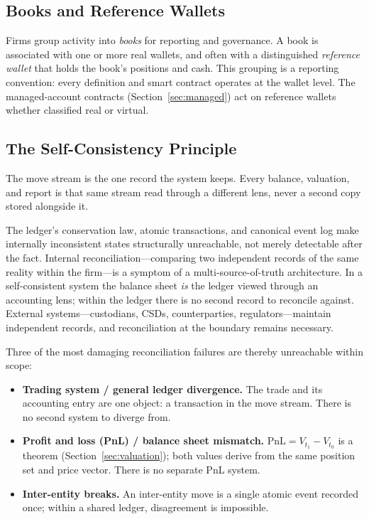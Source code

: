 \subsection{Books and Reference Wallets}

Firms group activity into \emph{books} for reporting and governance. A book is associated with one or more real wallets, and often with a distinguished \emph{reference wallet} that holds the book's positions and cash. This grouping is a reporting convention: every definition and smart contract operates at the wallet level. The managed-account contracts (Section~\ref{sec:managed}) act on reference wallets whether classified real or virtual.

\subsection{The Self-Consistency Principle}

The move stream is the one record the system keeps. Every balance, valuation, and report is that same stream read through a different lens, never a second copy stored alongside it.

\begin{principle}
The ledger's conservation law, atomic transactions, and canonical event log make internally inconsistent states structurally unreachable, not merely detectable after the fact. Internal reconciliation---comparing two independent records of the same reality within the firm---is a symptom of a multi-source-of-truth architecture. In a self-consistent system the balance sheet \emph{is} the ledger viewed through an accounting lens; within the ledger there is no second record to reconcile against. External systems---custodians, CSDs, counterparties, regulators---maintain independent records, and reconciliation at the boundary remains necessary.
\end{principle}

Three of the most damaging reconciliation failures are thereby unreachable within scope:

\begin{itemize}[nosep]
\item \textbf{Trading system / general ledger divergence.} The trade and its accounting entry are one object: a transaction in the move stream. There is no second system to diverge from.
\item \textbf{Profit and loss (PnL) / balance sheet mismatch.} $\mathrm{PnL} = V_{t_1} - V_{t_0}$ is a theorem (Section~\ref{sec:valuation}); both values derive from the same position set and price vector. There is no separate PnL system.
\item \textbf{Inter-entity breaks.} An inter-entity move is a single atomic event recorded once; within a shared ledger, disagreement is impossible.
\end{itemize}

